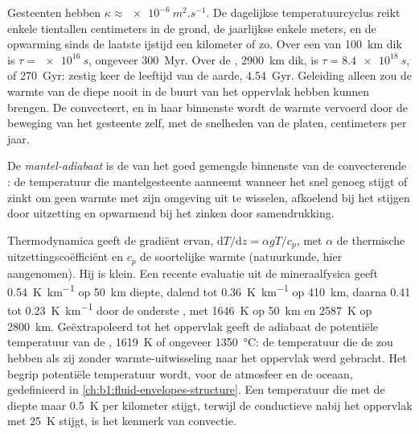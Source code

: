 Gesteenten hebben $\kappa \approx \qty{e-6}{m^2.s^{-1}}$. De dagelijkse temperatuurcyclus reikt enkele tientallen centimeters in de grond, de jaarlijkse enkele meters, en de opwarming sinds de laatste ijstijd een kilometer of zo. Over een  van \qty{100}{km} dik is $\tau = \qty{e16}{s}$, ongeveer \qty{300}{Myr}. Over de , \qty{2900}{km} dik, is $\tau = \qty{8.4e18}{s}$, of \qty{270}{Gyr}: zestig keer de leeftijd van de aarde, \qty{4.54}{Gyr}. %
Geleiding alleen zou de warmte van de diepe  nooit in de buurt van het oppervlak hebben kunnen brengen. De  convecteert, en in haar binnenste wordt de warmte vervoerd door de beweging van het gesteente zelf, met de snelheden van de platen, centimeters per jaar. %

\begin{definition}\label{def:b1:heat-budget:adiabat}
De \emph{mantel-adiabaat} is de  van het goed gemengde binnenste van de convecterende : de temperatuur die mantelgesteente aanneemt wanneer het snel genoeg stijgt of zinkt om geen warmte met zijn omgeving uit te wisselen, afkoelend bij het stijgen door uitzetting en opwarmend bij het zinken door samendrukking.
\end{definition}

Thermodynamica geeft de gradiënt ervan, $\mathrm dT/\mathrm dz = \alpha g T/c_p$, met $\alpha$ de thermische uitzettingscoëfficiënt en $c_p$ de soortelijke warmte (natuurkunde, hier aangenomen). Hij is klein. Een recente evaluatie uit de mineraalfysica geeft \qty{0.54}{K.km^{-1}} op \qty{50}{km} diepte, dalend tot \qty{0.36}{K.km^{-1}} op \qty{410}{km}, daarna 0.41 tot \qty{0.23}{K.km^{-1}} door de onderste , met \qty{1646}{K} op \qty{50}{km} en \qty{2587}{K} op \qty{2800}{km}.
Geëxtrapoleerd tot het oppervlak geeft de adiabaat de potentiële temperatuur van de , \qty{1619}{K} of ongeveer \qty{1350}{\degreeCelsius}: de temperatuur die de  zou hebben als zij zonder warmte-uitwisseling naar het oppervlak werd gebracht. Het begrip potentiële temperatuur wordt, voor de atmosfeer en de oceaan, gedefinieerd in \cref{ch:b1:fluid-envelopes-structure}. Een temperatuur die met de diepte maar \qty{0.5}{K} per kilometer stijgt, terwijl de conductieve  nabij het oppervlak met \qty{25}{K} stijgt, is het kenmerk van convectie.

